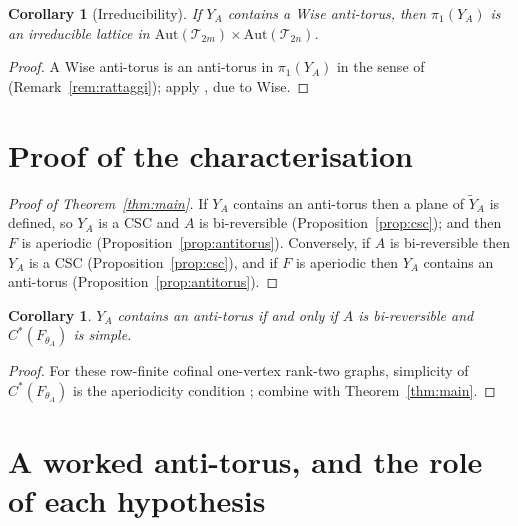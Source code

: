 \documentclass[11pt,reqno]{amsart}
\theoremstyle{plain}
\newtheorem{corollary}[theorem]{Corollary}
\theoremstyle{definition}
\begin{document}
\begin{corollary}[Irreducibility]\label{cor:irred}
If $Y_A$ contains a Wise anti-torus, then $\pi_1(Y_A)$ is an irreducible lattice in
$\mathrm{Aut}(\mathcal T_{2m})\times\mathrm{Aut}(\mathcal T_{2n})$.
\end{corollary}

\begin{proof}
A Wise anti-torus is an anti-torus in $\pi_1(Y_A)$ in the sense of
\cite[Definition~4]{Rat} (Remark~\ref{rem:rattaggi}); apply
\cite[Proposition~9]{Rat}, due to Wise.
\end{proof}

\section{Proof of the characterisation}

\begin{proof}[Proof of Theorem~\ref{thm:main}]
If $Y_A$ contains an anti-torus then a plane of $\widetilde Y_A$ is defined, so
$Y_A$ is a CSC and $A$ is bi-reversible (Proposition~\ref{prop:csc}); and then $F$
is aperiodic (Proposition~\ref{prop:antitorus}). Conversely, if $A$ is
bi-reversible then $Y_A$ is a CSC (Proposition~\ref{prop:csc}), and if $F$ is
aperiodic then $Y_A$ contains an anti-torus (Proposition~\ref{prop:antitorus}).
\end{proof}

\begin{corollary}\label{cor:simple}
$Y_A$ contains an anti-torus if and only if $A$ is bi-reversible and
$C^*(F_{\theta_A})$ is simple.
\end{corollary}

\begin{proof}
For these row-finite cofinal one-vertex rank-two graphs, simplicity of
$C^*(F_{\theta_A})$ is the aperiodicity condition \cite{RobS,DY}; combine with
Theorem~\ref{thm:main}.
\end{proof}

\section{A worked anti-torus, and the role of each hypothesis}
\end{document}
